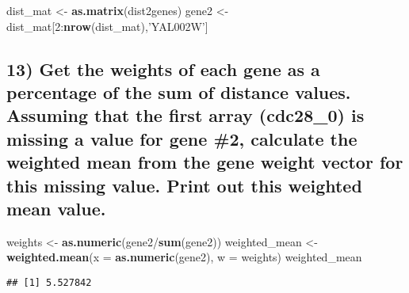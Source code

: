 \documentclass[]{article}
\newenvironment{Shaded}{\begin{snugshade}}{\end{snugshade}}
\newcommand{\KeywordTok}[1]{\textcolor[rgb]{0.13,0.29,0.53}{\textbf{{#1}}}}
\newcommand{\DataTypeTok}[1]{\textcolor[rgb]{0.13,0.29,0.53}{{#1}}}
\newcommand{\DecValTok}[1]{\textcolor[rgb]{0.00,0.00,0.81}{{#1}}}
\newcommand{\StringTok}[1]{\textcolor[rgb]{0.31,0.60,0.02}{{#1}}}
\newcommand{\NormalTok}[1]{{#1}}
\begin{document}
\begin{Shaded}
\begin{Highlighting}[]
\NormalTok{dist_mat <-}\StringTok{ }\KeywordTok{as.matrix}\NormalTok{(dist2genes)}
\NormalTok{gene2 <-}\StringTok{ }\NormalTok{dist_mat[}\DecValTok{2}\NormalTok{:}\KeywordTok{nrow}\NormalTok{(dist_mat),}\StringTok{'YAL002W'}\NormalTok{]}
\end{Highlighting}
\end{Shaded}

\subsection{13) Get the weights of each gene as a percentage of the sum
of distance values. Assuming that the first array (cdc28\_0) is missing
a value for gene \#2, calculate the weighted mean from the gene weight
vector for this missing value. Print out this weighted mean
value.}\label{get-the-weights-of-each-gene-as-a-percentage-of-the-sum-of-distance-values.-assuming-that-the-first-array-cdc28ux5f0-is-missing-a-value-for-gene-2-calculate-the-weighted-mean-from-the-gene-weight-vector-for-this-missing-value.-print-out-this-weighted-mean-value.}

\begin{Shaded}
\begin{Highlighting}[]
\NormalTok{weights <-}\StringTok{ }\KeywordTok{as.numeric}\NormalTok{(gene2/}\KeywordTok{sum}\NormalTok{(gene2))}
\NormalTok{weighted_mean <-}\StringTok{ }\KeywordTok{weighted.mean}\NormalTok{(}\DataTypeTok{x =} \KeywordTok{as.numeric}\NormalTok{(gene2), }\DataTypeTok{w =} \NormalTok{weights)}
\NormalTok{weighted_mean}
\end{Highlighting}
\end{Shaded}

\begin{verbatim}
## [1] 5.527842
\end{verbatim}
\end{document}
